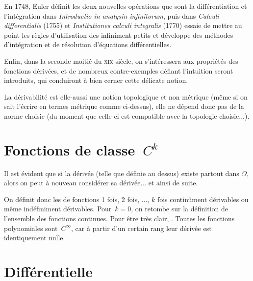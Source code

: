 \begin{histoire}
\medskip
En 1748, Euler définit les deux nouvelles opérations que sont la différentiation et l'intégration dans \emph{Introductio in analysin infinitorum}, puis dans \emph{Calculi differentialis} (1755) et \emph{Institutiones calculi integralis} (1770) essaie de mettre au point les règles d'utilisation des infiniment petits et développe des méthodes d'intégration et de résolution d'équations différentielles.

\medskip
Enfin, dans la seconde moitié du \textsc{xix} siècle, on s'intéressera aux propriétés des fonctions dérivées, et de nombreux contre-exemples défiant l'intuition seront introduits, qui conduiront à bien cerner cette délicate notion.
\end{histoire}

\medskip
La dérivabilité est elle-aussi une notion topologique et non métrique (même si on sait l'écrire en termes métrique comme ci-dessus), elle ne dépend donc pas de la norme choisie (du moment que celle-ci est compatible avec la topologie choisie...).


\medskip
\section{Fonctions de classe~$C^k$}

Il est évident que si la dérivée (telle que définie au dessus) existe partout dans $\Omega$, alors on peut à nouveau considérer sa dérivée... et ainsi de suite.

On définit donc les  de fonctions 1 fois, 2 fois, ..., $k$ fois continûment dérivables ou même indéfiniment dérivables.
\medskipvm
Pour~$k=0$, on retombe sur la définition de l'ensemble des fonctions continues.
\medskipvm
Pour être très clair, .
\medskipvm
Toutes les fonctions polynomiales sont~$C^\infty$, car à partir d'un certain rang leur dérivée est identiquement nulle.

\medskip
\section{Différentielle}\label{Sec-Differentielle}%


